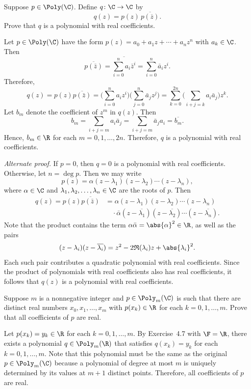 \begin{exc}
\begin{exercise}
Suppose $p\in\Poly(\C)$. Define $q\colon\C\to\C$ by
\[ q(z) = p(z)\,\overline{p(\overline{z})}. \]
Prove that $q$ is a polynomial with real coefficients.
\end{exercise}
\begin{solution}
Let $p\in\Poly(\C)$ have the form $p(z)=a_0+a_1z+\cdots+a_nz^n$ with
$a_k\in\C$. Then
\[ \overline{p(\bar{z})}=\overline{\sum_{i=0}^{n}a_i\bar{z}^i}
   =\sum_{i=0}^{n}\bar{a}_iz^i. \]
Therefore,
\[ q(z)=p(z)\overline{p(\bar{z})}
   =\biggl(\sum_{i=0}^{n}a_iz^i\biggr)\biggl(\sum_{j=0}^{n}\bar{a}_jz^j\biggr)
   =\sum_{k=0}^{2n}\biggl(\sum_{i+j=k}a_i\bar{a}_j\biggr)z^k. \]
Let $b_m$ denote the coefficient of $z^m$ in $q(z)$. Then
\[ b_m=\sum_{i+j=m}a_i\bar{a}_j=\sum_{i+j=m}\bar{a}_ja_i=\overline{b_m}. \]
Hence, $b_m\in\R$ for each $m=0,1,\dots,2n$. Therefore, $q$ is a polynomial
with real coefficients.

\emph{Alternate proof.} If $p=0$, then $q=0$ is a polynomial with real
coefficients. Otherwise, let $n=\deg p$. Then we may write
\[ p(z)=\alpha(z-\lambda_1)(z-\lambda_2)\cdots(z-\lambda_n), \]
where $\alpha\in\C$ and $\lambda_1,\lambda_2,\dots,\lambda_n\in\C$ are the
roots of $p$. Then
\begin{align*}
q(z)=p(z)\overline{p(\bar{z})}
  &=\alpha(z-\lambda_1)(z-\lambda_2)\cdots(z-\lambda_n)\\
  &\quad\cdot\bar{\alpha}(z-\overline{\lambda_1})(z-\overline{\lambda_2})
    \cdots(z-\overline{\lambda_n}).
\end{align*}
Note that the product contains the term $\alpha\bar{\alpha}=\abs{\alpha}^2\in\R$,
as well as the pairs
\[ (z-\lambda_i)(z-\overline{\lambda_i})=z^2-2\mathfrak{R}(\lambda_i)z
   +\abs{\lambda_i}^2. \]
Each such pair contributes a quadratic polynomial with real coefficients. Since
the product of polynomials with real coefficients also has real coefficients,
it follows that $q(z)$ is a polynomial with real coefficients.
\end{solution}

\begin{exercise}
Suppose $m$ is a nonnegative integer and $p\in\Poly_m(\C)$ is such that there
are distinct real numbers $x_0,x_1,\dots,x_m$ with $p(x_k)\in\R$ for each
$k=0,1,\dots,m$. Prove that all coefficients of $p$ are real.
\end{exercise}
\begin{solution}
Let $p(x_k)=y_k\in\R$ for each $k=0,1,\dots,m$. By Exercise~4.7 with $\F=\R$,
there exists a polynomial $q\in\Poly_m(\R)$ that satisfies $q(x_k)=y_k$ for
each $k=0,1,\dots,m$. Note that this polynomial must be the same as the
original $p\in\Poly_m(\C)$ because a polynomial of degree at most $m$ is
uniquely determined by its values at $m+1$ distinct points. Therefore, all
coefficients of $p$ are real.
\end{solution}


\end{exc}
